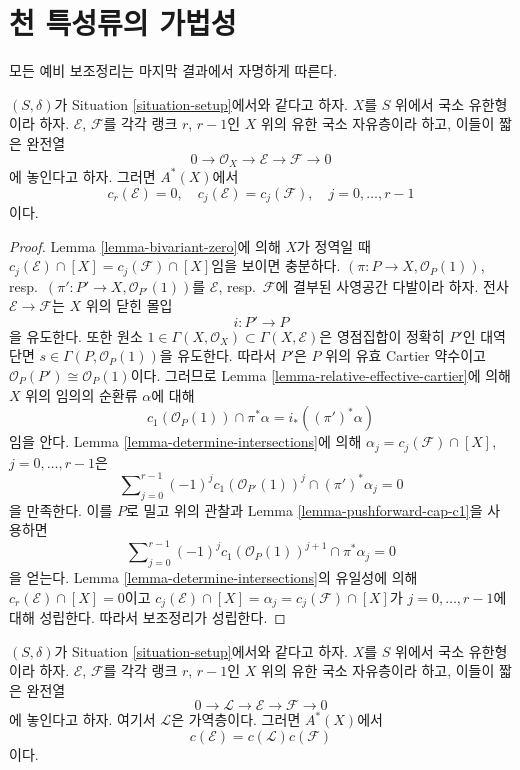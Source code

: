 \section{천 특성류의 가법성}
\label{section-additivity-chern-classes}

\noindent
모든 예비 보조정리는 마지막 결과에서 자명하게 따른다.

\begin{lemma}
\label{lemma-get-rid-of-trivial-subbundle}
$(S, \delta)$가 Situation \ref{situation-setup}에서와 같다고 하자.
$X$를 $S$ 위에서 국소 유한형이라 하자. $\mathcal{E}$,
$\mathcal{F}$를 각각 랭크 $r$, $r - 1$인 $X$ 위의 유한 국소 자유층이라
하고, 이들이 짧은 완전열
$$
0 \to \mathcal{O}_X \to \mathcal{E} \to \mathcal{F} \to 0
$$
에 놓인다고 하자. 그러면 $A^*(X)$에서
$$
c_r(\mathcal{E}) = 0, \quad
c_j(\mathcal{E}) = c_j(\mathcal{F}), \quad j = 0, \ldots, r - 1
$$
이다.
\end{lemma}

\begin{proof}
Lemma \ref{lemma-bivariant-zero}에 의해 $X$가 정역일 때
$c_j(\mathcal{E}) \cap [X] = c_j(\mathcal{F}) \cap [X]$임을 보이면
충분하다. $(\pi : P \to X, \mathcal{O}_P(1))$,
resp.\ $(\pi' : P' \to X, \mathcal{O}_{P'}(1))$를
$\mathcal{E}$, resp.\ $\mathcal{F}$에 결부된 사영공간 다발이라 하자.
전사 $\mathcal{E} \to \mathcal{F}$는 $X$ 위의 닫힌 몰입
$$
i : P' \longrightarrow P
$$
을 유도한다. 또한 원소
$1 \in \Gamma(X, \mathcal{O}_X) \subset \Gamma(X, \mathcal{E})$은
영점집합이 정확히 $P'$인 대역 단면
$s \in \Gamma(P, \mathcal{O}_P(1))$을 유도한다. 따라서 $P'$은 $P$
위의 유효 Cartier 약수이고
$\mathcal{O}_P(P') \cong \mathcal{O}_P(1)$이다. 그러므로 Lemma
\ref{lemma-relative-effective-cartier}에 의해 $X$ 위의 임의의 순환류
$\alpha$에 대해
$$
c_1(\mathcal{O}_P(1)) \cap \pi^*\alpha = i_*((\pi')^*\alpha)
$$
임을 안다. Lemma \ref{lemma-determine-intersections}에 의해
$\alpha_j = c_j(\mathcal{F}) \cap [X]$, $j = 0, \ldots, r - 1$은
$$
\sum\nolimits_{j = 0}^{r - 1} (-1)^jc_1(\mathcal{O}_{P'}(1))^j
\cap (\pi')^*\alpha_j = 0
$$
을 만족한다. 이를 $P$로 밀고 위의 관찰과 Lemma
\ref{lemma-pushforward-cap-c1}을 사용하면
$$
\sum\nolimits_{j = 0}^{r - 1}
(-1)^j c_1(\mathcal{O}_P(1))^{j + 1}
\cap \pi^*\alpha_j = 0
$$
을 얻는다. Lemma \ref{lemma-determine-intersections}의 유일성에 의해
$c_r(\mathcal{E}) \cap [X] = 0$이고
$c_j(\mathcal{E}) \cap [X] = \alpha_j = c_j(\mathcal{F}) \cap [X]$가
$j = 0, \ldots, r - 1$에 대해 성립한다. 따라서 보조정리가 성립한다.
\end{proof}

\begin{lemma}
\label{lemma-additivity-invertible-subsheaf}
$(S, \delta)$가 Situation \ref{situation-setup}에서와 같다고 하자.
$X$를 $S$ 위에서 국소 유한형이라 하자. $\mathcal{E}$,
$\mathcal{F}$를 각각 랭크 $r$, $r - 1$인 $X$ 위의 유한 국소 자유층이라
하고, 이들이 짧은 완전열
$$
0 \to \mathcal{L} \to \mathcal{E} \to \mathcal{F} \to 0
$$
에 놓인다고 하자. 여기서 $\mathcal{L}$은 가역층이다. 그러면
$A^*(X)$에서
$$
c(\mathcal{E}) = c(\mathcal{L}) c(\mathcal{F})
$$
이다.
\end{lemma}

